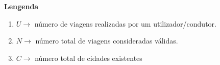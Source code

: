\documentclass[12pt,a4paper]{report}
\begin{document}
\vspace{10pt}

\normalsize\textbf{Lengenda}

\begin{enumerate}
    \item \(U \rightarrow\) número de viagens realizadas por um utilizador/condutor.
    \item \(N \rightarrow\) número total de viagens consideradas válidas. 
    \item \(C \rightarrow\) número total de cidades existentes
\end{enumerate}
\end{document}
